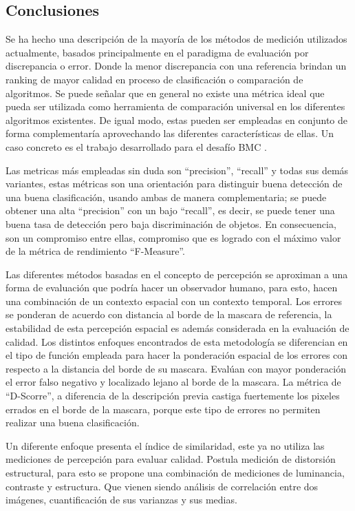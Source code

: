\subsection{Conclusiones}
Se ha hecho una descripción de la mayoría de los métodos de medición utilizados actualmente, basados principalmente en el paradigma de evaluación por discrepancia  o error. Donde la menor discrepancia con una referencia brindan un ranking de mayor calidad en proceso de clasificación o comparación de algoritmos. Se puede señalar que en general no existe una métrica ideal que pueda ser utilizada como herramienta de comparación universal en los diferentes algoritmos existentes. De igual modo, estas pueden ser empleadas en conjunto de forma complementaría aprovechando las diferentes características de ellas. Un caso concreto es el trabajo desarrollado para el desafío BMC \cite{park_benchmark_2013}.

Las metricas más empleadas sin duda son ``precision'', ``recall'' y todas sus demás variantes, estas métricas son una orientación para distinguir buena detección de una buena clasificación, usando ambas de manera complementaria; se puede obtener una alta ``precision'' con un bajo ``recall'', es decir, se puede tener una buena tasa de detección pero baja discriminación de objetos. En consecuencia, son un compromiso entre ellas, compromiso que es logrado con el máximo valor de la métrica de rendimiento ``F-Measure''. 

Las diferentes métodos basadas en el concepto de percepción se aproximan a una forma de evaluación que podría hacer un observador humano, para esto, hacen una combinación de un contexto espacial con un contexto temporal. Los errores se ponderan de acuerdo con distancia al borde de la mascara de referencia, la estabilidad de esta percepción espacial es además considerada en la evaluación de calidad. Los distintos enfoques encontrados de esta metodología se diferencian en el tipo de función empleada para hacer la ponderación espacial de los errores con respecto a la distancia del borde de su mascara. Evalúan con mayor ponderación el error falso negativo y localizado lejano al borde de la mascara. La métrica de ``D-Scorre'', a diferencia de la descripción previa castiga fuertemente los pixeles errados en el borde de la mascara, porque este tipo de errores no permiten realizar una buena clasificación.

Un diferente enfoque presenta el índice de similaridad, este ya no utiliza las mediciones de percepción para evaluar calidad. Postula medición de distorsión estructural, para esto se propone una combinación de mediciones de luminancia, contraste y estructura. Que vienen siendo análisis de correlación entre dos imágenes, cuantificación de sus varianzas y sus medias. 

